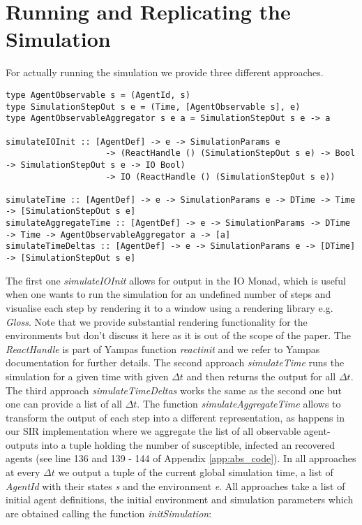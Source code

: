 \section{Running and Replicating the Simulation}
For actually running the simulation we provide three different approaches. 

\begin{verbatim}
type AgentObservable s = (AgentId, s)
type SimulationStepOut s e = (Time, [AgentObservable s], e)
type AgentObservableAggregator s e a = SimulationStepOut s e -> a

simulateIOInit :: [AgentDef] -> e -> SimulationParams e
                    -> (ReactHandle () (SimulationStepOut s e) -> Bool -> SimulationStepOut s e -> IO Bool)
                    -> IO (ReactHandle () (SimulationStepOut s e))
                    
simulateTime :: [AgentDef] -> e -> SimulationParams e -> DTime -> Time -> [SimulationStepOut s e]
simulateAggregateTime :: [AgentDef] -> e -> SimulationParams -> DTime -> Time -> AgentObservableAggregator a -> [a]
simulateTimeDeltas :: [AgentDef] -> e -> SimulationParams e -> [DTime] -> [SimulationStepOut s e]
\end{verbatim}

The first one \textit{simulateIOInit} allows for output in the IO Monad, which is useful when one wants to run the simulation for an undefined number of steps and visualise each step by rendering it to a window using a rendering library e.g. \textit{Gloss}. Note that we provide substantial rendering functionality for the environments but don't discuss it here as it is out of the scope of the paper. The \textit{ReactHandle} is part of Yampas function \textit{reactinit} and we refer to Yampas documentation for further details. The second approach \textit{simulateTime} runs the simulation for a given time with given $\Delta t$ and then returns the output for all $\Delta t$. The third approach \textit{simulateTimeDeltas} works the same as the second one but one can provide a list of all $\Delta t$. The function \textit{simulateAggregateTime} allows to transform the output of each step into a different representation, as happens in our SIR implementation where we aggregate the list of all observable agent-outputs into a tuple holding the number of susceptible, infected an recovered agents (see line 136 and 139 - 144 of Appendix \ref{app:abs_code}).
In all approaches at every $\Delta t$ we output a tuple of the current global simulation time, a list of \textit{AgentId} with their states \textit{s} and the environment \textit{e}. All approaches take a list of initial agent definitions, the initial environment and simulation parameters which are obtained calling the function \textit{initSimulation}:

